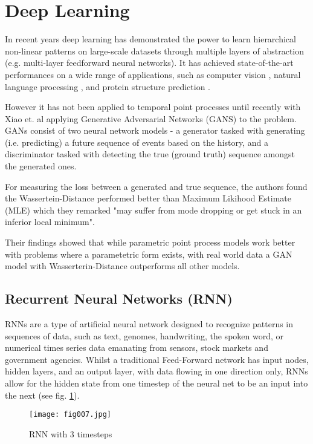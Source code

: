 \section{Deep Learning}

In recent years deep learning has demonstrated the power to learn hierarchical non-linear patterns on large-scale datasets \parencite{DL} through multiple layers of abstraction (e.g. multi-layer feedforward neural networks). It has achieved state-of-the-art performances on a wide range of applications, such as computer vision \parencite{ImageNet}, natural language processing \parencite{Socher}, and protein structure prediction \parencite{Lena}.

However it has not been applied to temporal point processes until recently with Xiao et. al \parencite{Wass} applying Generative Adversarial Networks (GANS) to the problem. GANs consist of two neural network models - a generator tasked with generating (i.e. predicting) a future sequence of events based on the history, and a discriminator tasked with detecting the true (ground truth) sequence amongst the generated ones.

For measuring the loss between a generated and true sequence, the authors found the Wassertein-Distance \parencite{WassGAN} performed better than Maximum Likihood Estimate (MLE) which they remarked "may suffer from mode dropping or get stuck in an inferior local minimum".

Their findings showed that while parametric point process models work better with problems where a parametetric form exists, with real world data a GAN model with Wasserterin-Distance outperforms all other models. 

\subsection{Recurrent Neural Networks (RNN)}

RNNs are a type of artificial neural network designed to recognize patterns in sequences of data, such as text, genomes, handwriting, the spoken word, or numerical times series data emanating from sensors, stock markets and government agencies. Whilst a traditional Feed-Forward network \parencite{MLP} has input nodes, hidden layers, and an output layer, with data flowing in one direction only, RNNs allow for the hidden state from one timestep of the neural net to be an input into the next (see fig. \ref{RNN}).

\begin{figure}[h!]
	\centering
	\texttt{[image: fig007.jpg]}
	\caption{RNN with 3 timesteps}
	\label{RNN}
\end{figure} 

